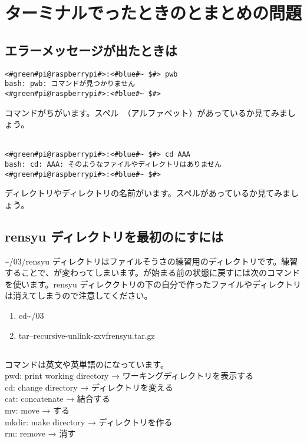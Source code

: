 \section{ターミナルでったときのとまとめの問題}

\subsection{エラーメッセージが出たときは}
\begin{lstlisting}[caption=コマンドがちがうときの例, label=cmdMiss]
<#green#pi@raspberrypi#>:<#blue#~ $#> pwb
bash: pwb: コマンドが見つかりません
<#green#pi@raspberrypi#>:<#blue#~ $#> 
\end{lstlisting}
コマンドがちがいます。スペル　（アルファベット）があっているか見てみましょう。\\\\

\begin{lstlisting}[caption=ディレクトリやファイルの名前がちがうときの例, label=nameMiss]
<#green#pi@raspberrypi#>:<#blue#~ $#> cd AAA
bash: cd: AAA: そのようなファイルやディレクトリはありません
<#green#pi@raspberrypi#>:<#blue#~ $#> 
\end{lstlisting}
ディレクトリやディレクトリの名前がいます。スペルがあっているか見てみましょう。\\


\subsection{rensyu ディレクトリを最初のにすには}
\textasciitilde /03/rensyu ディレクトリはファイルそうさの練習用のディレクトリです。練習することで、が変わってしまいます。が始まる前の状態に戻すには次のコマンドを使います。rensyu ディレククトリの下の自分で作ったファイルやディレクトリは消えてしまうので注意してください。\\
\begin{enumerate}
\item  cd\textvisiblespace \textasciitilde /03
\item  tar\textvisiblespace --recursive-unlink\textvisiblespace -zxvf\textvisiblespace rensyu.tar.gz
\end{enumerate}

\subsection{}
\label{英語と日本語の対応表}
コマンドは英文や英単語のになっています。\\
pwd: print working directory → ワーキングディレクトリを表示する\\
cd: change directory → ディレクトリを変える\\
cat: concatenate → 結合する\\
mv: move → する\\
mkdir: make directory → ディレクトリを作る\\
rm: remove → 消す\\
